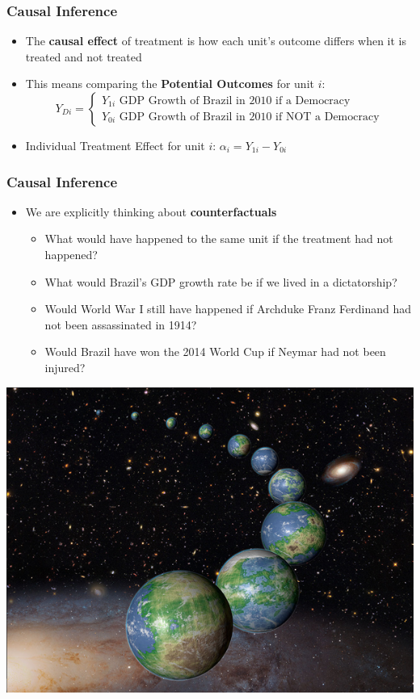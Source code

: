 \documentclass[xcolor=x11names,compress]{beamer}\usepackage[]{graphicx}\usepackage[]{color}
\renewcommand{\(}{\begin{columns}}
\renewcommand{\)}{\end{columns}}
\newcommand{\<}[1]{\begin{column}{#1}}
\renewcommand{\>}{\end{column}}
\begin{document}
\begin{frame}
\frametitle{Causal Inference}
\begin{itemize}
\item The \textbf{causal effect} of treatment is how each unit's outcome differs when it is treated and not treated
\item This means comparing the \textbf{Potential Outcomes} for unit $i$:
\[
Y_{Di} = 
\begin{cases}
Y_{1i}\text{   GDP Growth of Brazil in 2010 if a Democracy} \\
Y_{0i}\text{   GDP Growth of Brazil in 2010 if NOT a Democracy}
\end{cases}
\]
\item Individual Treatment Effect for unit $i$: $\alpha_i = Y_{1i} - Y_{0i}$
\end{itemize}
\end{frame}

\begin{frame}
\frametitle{Causal Inference}
\begin{itemize}
\item We are explicitly thinking about \textbf{counterfactuals}
\pause
\begin{itemize}
\item What would have happened to the same unit if the treatment had not happened?
\pause
\item What would Brazil's GDP growth rate be if we lived in a dictatorship?
\pause
\item Would World War I still have happened if Archduke Franz Ferdinand had not been assassinated in 1914?
\pause
\item Would Brazil have won the 2014 World Cup if Neymar had not been injured?
\pause
\end{itemize}
\end{itemize}
\end{frame}

\includegraphics[width=1\textwidth]{figure/Multiverse.png}
\end{document}
